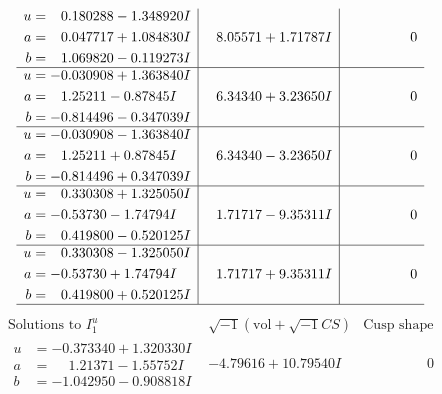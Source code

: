 \documentclass[1p]{elsarticle_modified}
\theoremstyle{definition}
\newcommand{\I}{\sqrt{-1}}
\begin{document}
$$\begin{array}{c|c|c}
\begin{aligned}
u &= \phantom{-}0.180288 - 1.348920 I \\
a &= \phantom{-}0.047717 + 1.084830 I \\
b &= \phantom{-}1.069820 - 0.119273 I\end{aligned}
 & \phantom{-}8.05571 + 1.71787 I & \phantom{-0.000000 } 0 \\ \hline\begin{aligned}
u &= -0.030908 + 1.363840 I \\
a &= \phantom{-}1.25211 - 0.87845 I \\
b &= -0.814496 - 0.347039 I\end{aligned}
 & \phantom{-}6.34340 + 3.23650 I & \phantom{-0.000000 } 0 \\ \hline\begin{aligned}
u &= -0.030908 - 1.363840 I \\
a &= \phantom{-}1.25211 + 0.87845 I \\
b &= -0.814496 + 0.347039 I\end{aligned}
 & \phantom{-}6.34340 - 3.23650 I & \phantom{-0.000000 } 0 \\ \hline\begin{aligned}
u &= \phantom{-}0.330308 + 1.325050 I \\
a &= -0.53730 - 1.74794 I \\
b &= \phantom{-}0.419800 - 0.520125 I\end{aligned}
 & \phantom{-}1.71717 - 9.35311 I & \phantom{-0.000000 } 0 \\ \hline\begin{aligned}
u &= \phantom{-}0.330308 - 1.325050 I \\
a &= -0.53730 + 1.74794 I \\
b &= \phantom{-}0.419800 + 0.520125 I\end{aligned}
 & \phantom{-}1.71717 + 9.35311 I & \phantom{-0.000000 } 0\\
 \hline 
 \end{array}$$\newpage$$\begin{array}{c|c|c}  
\text{Solutions to }I^u_{1}& \I (\text{vol} + \sqrt{-1}CS) & \text{Cusp shape}\\
 \hline 
\begin{aligned}
u &= -0.373340 + 1.320330 I \\
a &= \phantom{-}1.21371 - 1.55752 I \\
b &= -1.042950 - 0.908818 I\end{aligned}
 & -4.79616 + 10.79540 I & \phantom{-0.000000 } 0 \\ \hline\begin{aligned}

\end{aligned}
\end{array}$$
\end{document}
